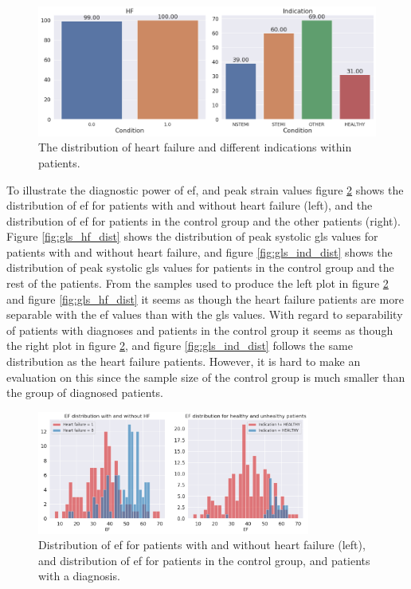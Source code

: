 \begin{figure}[h]
    \begin{center}
    \includegraphics[width=\textwidth]{data-exp/hf_indication_dist.png}
    \end{center}
    \caption{The distribution of heart failure and different indications within patients.}
    \label{fig:hf_ind_dist}
\end{figure}

To illustrate the diagnostic power of \acrshort{ef}, and peak strain values figure \ref{fig:ef_hf_ind_dist} 
shows the distribution of \acrshort{ef} for patients with and without heart failure (left), and the distribution of \acrshort{ef} for patients in the control group and the other patients (right). 
Figure \ref{fig:gls_hf_dist} shows the distribution of peak systolic \acrshort{gls} values for patients with and without heart failure, 
and figure \ref{fig:gls_ind_dist} shows the distribution of peak systolic \acrshort{gls} values for patients in the control group and the rest of the patients. 
From the samples used to produce the left plot in figure \ref{fig:ef_hf_ind_dist} and figure \ref{fig:gls_hf_dist} 
it seems as though the heart failure patients are more separable with the \acrshort{ef} values than with the \acrshort{gls} values. 
With regard to separability of patients with diagnoses and patients in the control group it seems as though the right plot in figure \ref{fig:ef_hf_ind_dist}, 
and figure \ref{fig:gls_ind_dist} follows the same distribution as the heart failure patients. 
However, it is hard to make an evaluation on this since the sample size of the control group is much smaller than the group of diagnosed patients.\bigskip

\begin{figure}[h]
    \begin{center}
    \includegraphics[width=0.8\textwidth]{data-exp/EF_HF_ind_dist.png}
    \end{center}
    \caption{Distribution of \acrshort{ef} for patients with and without heart failure (left), and distribution of \acrshort{ef} for patients in the control group, and patients with a diagnosis.}
    \label{fig:ef_hf_ind_dist}
\end{figure}

